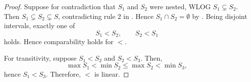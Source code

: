 \begin{proof}
    Suppose for contradiction that $S_1$ and $S_2$ were nested, WLOG $S_1\subsetneq S_2$. Then $S_1\subsetneq S_2\subsetneq S$, contradicting rule $2$ in . Hence $S_1\cap S_2=\emptyset$ by . Being disjoint intervals, exactly one of
    \begin{equation*}
        S_1<S_2,\qquad S_2<S_1
    \end{equation*}
    holds. Hence comparability holds for $<$.

    For transitivity, suppose $S_1<S_2$ and $S_2<S_3$. Then,
    \begin{equation*}
        \max S_1<\min S_2\leq\max S_2<\min S_3,
    \end{equation*}
    hence $S_1<S_3$. Therefore, $<$ is linear.
\end{proof}
